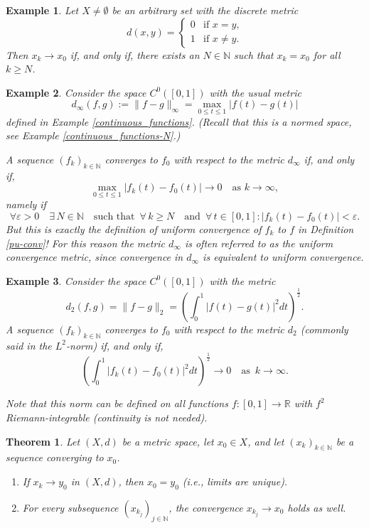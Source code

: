 \documentclass[a4paper,reqno]{amsart}
\numberwithin{equation}{section}
\newtheorem{theorem}[definition]{Theorem}
\newtheorem{example}{Example}
\def\N{\mathbb{N}}
\def\R{\mathbb{R}}
\begin{document}
\begin{example}
Let $X \not= \emptyset$ be an arbitrary set with the discrete metric
\[
d(x,y) = \begin{cases} 0 & \text{if $x = y$,} \\ 1 & \text{if $x \not= y$.} \end{cases}
\]
Then $x_k \to x_0$ if, and only if, there exists an $N \in \N$ such that $x_k = x_0$ for all
$k \ge N$.
\end{example}

\begin{example}
Consider the space $C^0([0,1])$ with the usual metric
\[
d_\infty(f,g):= \|f-g\|_{\infty} = \max_{0 \le t \le 1} |f(t) - g(t)|
\]
defined in Example \ref{continuous_functions}. (Recall that this is a normed space, see Example \ref{continuous_functions-N}.)

A sequence $(f_k)_{k \in \N}$ converges to $f_0$ with respect to the metric $d_\infty$ if, and only if,
$$
\max_{0 \le t \le 1} |f_k(t) - f_0(t)| \to 0 \quad \textrm{as } k\to \infty,
$$
namely if
\[
\forall \varepsilon > 0 \quad \exists \,N \in \N \quad\textrm{such that } \, \forall \, k \ge N \quad \textrm{and } \, \forall \, t \in [0,1] : |f_k(t) - f_0(t)| < \varepsilon.
\]
But this is exactly the definition of uniform convergence of $f_k$ to $f$ in Definition \ref{pu-conv}! For this reason the metric $d_\infty$ is often referred to as the \textit{uniform convergence metric}, since convergence in $d_\infty$ is equivalent to uniform convergence.
\end{example}

\begin{example}
Consider the space $C^0([0,1])$ with the metric
\[
d_2(f,g) = \|f-g\|_{2} = \left(\int_0^1 |f(t) - g(t)|^2 dt\right)^\frac12.
\]
A sequence $(f_k)_{k \in \N}$ converges to $f_0$ with respect to the metric $d_2$ (commonly said in the $L^2$-norm) if, and only if,
\[
\left(\int_0^1 |f_k(t) - f_0(t)|^2 dt\right)^\frac12 \to 0 \quad \textrm{as } \, k\to \infty.
\]
\smallskip

Note that this norm can be defined on all functions $f: [0,1] \to \R$ with $f^2$ Riemann-integrable (continuity is not needed).

\end{example}


\begin{theorem} \label{thm:uniqueness}
Let  $(X,d)$ be a metric space, let $x_0\in X$, and let $(x_k)_{k \in \N}$ be a sequence converging to $x_0$.
\begin{enumerate}
\item \label{item2.1.1.i} If $x_k \to y_0$ in $(X,d)$, then $x_0 = y_0$ (i.e., limits are unique).
\item \label{item2.1.1.iii} For every subsequence $(x_{k_j})_{j \in \N}$, the convergence
$x_{k_j} \to x_0$ holds as well.
\end{enumerate}
\end{theorem}
\end{document}
